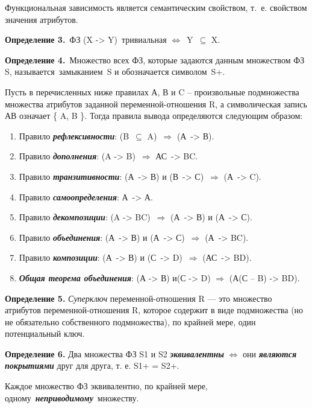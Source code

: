 Функциональная зависимость является семантическим свойством, т.~е. свойством значения атрибутов.

\textbf{Определение 3.} ФЗ (X -> Y) тривиальная $\Leftrightarrow$ Y $\subseteq$ X.

\textbf{Определение 4.} Множество всех ФЗ, которые задаются данным множеством ФЗ S, называется замыканием S и обозначается символом S+.

Пусть в перечисленных ниже правилах А, В и C – произвольные подмножества множества атрибутов заданной переменной-отношения R, а символическая запись АВ означает \{ A, B \}. 
Тогда правила вывода определяются следующим образом:

\begin{enumerate}[label={\arabic*)}]
	\item  Правило \textit{\bfseries рефлексивности}: (B $\subseteq$ A) $\Rightarrow$ (А -> В).
	\item  Правило \textit{\bfseries дополнения}: (A -> B) $\Rightarrow$ АС -> BC.
	\item  Правило \textit{\bfseries транзитивности}: (А -> В) и (В -> С) $\Rightarrow$ (А -> C).
	\item  Правило \textit{\bfseries самоопределения}: А -> А.
	\item  Правило \textit{\bfseries декомпозиции}: (A -> BC) $\Rightarrow$ (А -> В) и (А -> С).
	\item  Правило \textit{\bfseries объединения}: (А -> В) и (А -> С) $\Rightarrow$ (А -> BC). 
	\item  Правило \textit{\bfseries композиции}: (А -> В) и (С -> D) $\Rightarrow$ (АС -> BD).
	\item  \textit{\bfseries Общая теорема объединения}: (А -> В) и(С -> D) $\Rightarrow$ (А(С – B) -> BD).
\end{enumerate}

\clearpage

\textbf{Определение 5.} \textit{Суперключ} переменной-отношения R --- это множество атрибутов переменной-отношения R, которое содержит в виде подмножества (но не обязательно собственного подмножества), по крайней мере, один потенциальный ключ.

\textbf{Определение 6.} Два множества ФЗ S1 и S2 \textit{\bfseries эквивалентны} $\Leftrightarrow$ они \textit{\bfseries являются покрытиями} друг для друга, т. е. S1+ = S2+.

Каждое множество ФЗ эквивалентно, по крайней мере, одному \textit{\bfseries неприводимому} множеству.


